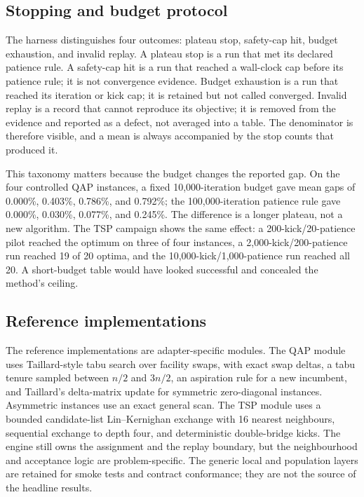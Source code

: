\documentclass[10pt]{article}
\begin{document}
\subsection{Stopping and budget protocol}

The harness distinguishes four outcomes: plateau stop, safety-cap hit, budget exhaustion, and
invalid replay. A plateau stop is a run that met its declared patience rule. A safety-cap hit is a
run that reached a wall-clock cap before its patience rule; it is not convergence evidence. Budget
exhaustion is a run that reached its iteration or kick cap; it is retained but not called converged.
Invalid replay is a record that cannot reproduce its objective; it is removed from the evidence and
reported as a defect, not averaged into a table. The denominator is therefore visible, and a mean is
always accompanied by the stop counts that produced it.

This taxonomy matters because the budget changes the reported gap. On the four controlled QAP
instances, a fixed 10,000-iteration budget gave mean gaps of 0.000\%, 0.403\%, 0.786\%, and 0.792\%;
the 100,000-iteration patience rule gave 0.000\%, 0.030\%, 0.077\%, and 0.245\%. The difference is a
longer plateau, not a new algorithm. The TSP campaign shows the same effect: a 200-kick/20-patience pilot reached
the optimum on three of four instances, a 2,000-kick/200-patience run reached 19 of 20 optima, and
the 10,000-kick/1,000-patience run reached all 20. A short-budget table would have looked successful
and concealed the method's ceiling.

\subsection{Reference implementations}

The reference implementations are adapter-specific modules. The QAP module uses Taillard-style tabu search
\citep{taillard1991} over facility swaps, with exact swap deltas, a tabu tenure sampled between
$n/2$ and $3n/2$, an aspiration rule for a new incumbent, and Taillard's delta-matrix update for
symmetric zero-diagonal instances. Asymmetric instances use an exact general scan. The TSP module
uses a bounded candidate-list Lin--Kernighan exchange \citep{lin1973} with 16 nearest neighbours,
sequential exchange to depth four, and deterministic double-bridge kicks. The engine still owns the
assignment and the replay boundary, but the neighbourhood and acceptance logic are problem-specific.
The generic local and population layers \citep{kirkpatrick1983,talbi2009,pisinger2010} are retained
for smoke tests and contract conformance; they are not the source of the headline results.
\end{document}
